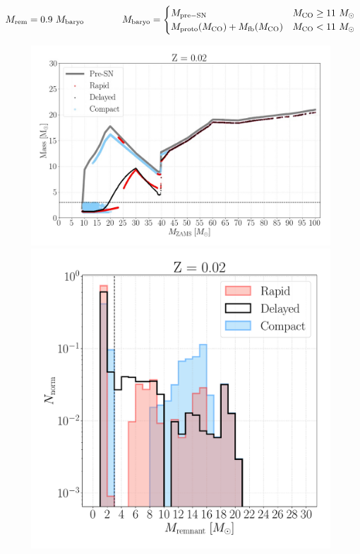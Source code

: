 \documentclass[a4paper,titlepage]{book}     	%
\newcommand{\sun}{\ensuremath{_\odot}}
\newcommand{\msun}{\ensuremath{M\sun}}
\begin{document}
\begin{equation}\label{eq:fryermass}
    M_{\rm rem} = 0.9~M_{\rm baryo} \qquad \qquad M_{\rm baryo} = 
    \begin{cases}
    M_{\rm pre-SN} & M_{\rm CO} \geq 11~\msun \\
    M_{\rm proto}(M_{\rm CO}) + M_{\rm fb}(M_{\rm CO}) & M_{\rm CO} < 11~\msun 
    \end{cases}
\end{equation}


\begin{figure}[t!]
	\begin{minipage}{.60\textwidth}
		\centering
		\includegraphics[width=1.05\textwidth]{./images/remnants_Z02.jpg}
	\end{minipage}
	\hfill
	\begin{minipage}{.39\textwidth}
		\centering
		\includegraphics[width=1.05\textwidth]{./images/hist_Z02.pdf}	

\end{minipage}
\end{figure}
\end{document}
